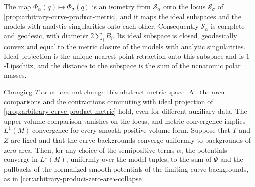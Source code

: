 \begin{proposition}\label{prop:general-auxiliary-product-metric}
The map $\Phi_\alpha(q)\mapsto\Phi_\sigma(q)$ is an isometry from $\mathcal S_\alpha$ onto the locus $\mathcal S_\sigma$ of \cref{prop:arbitrary-curve-product-metric}, and it maps the ideal subspaces and the models with analytic singularities onto each other. Consequently $\mathcal S_\alpha$ is complete and geodesic, with diameter $2\sum_iB_i$. Its ideal subspace is closed, geodesically convex and equal to the metric closure of the models with analytic singularities. Ideal projection is the unique nearest-point retraction onto this subspace and is $1$-Lipschitz, and the distance to the subspace is the sum of the nonatomic polar masses.

Changing $T$ or $\alpha$ does not change this abstract metric space. All the area comparisons and the contractions commuting with ideal projection of \cref{prop:arbitrary-curve-product-metric} hold, even for different auxiliary data. The upper-volume comparison vanishes on the locus, and metric convergence implies $L^1(M)$ convergence for every smooth positive volume form. Suppose that $T$ and $Z$ are fixed and that the curve backgrounds converge uniformly to backgrounds of zero area. Then, for any choice of the semipositive terms $\alpha$, the potentials converge in $L^1(M)$, uniformly over the model tuples, to the sum of $\Psi$ and the pullbacks of the normalized smooth potentials of the limiting curve backgrounds, as in \cref{cor:arbitrary-product-zero-area-collapse}.
\end{proposition}
